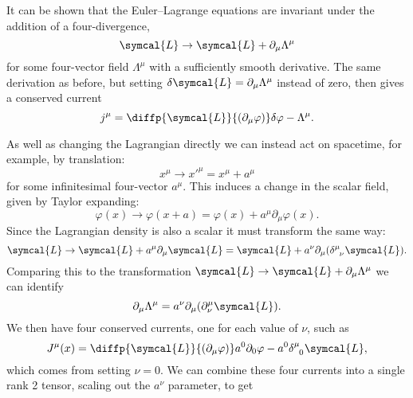 \documentclass[fleqn]{NotesClass}
\newcommand{\lagrangianDensity}{\symcal{L}}
\begin{document}
    It can be shown that the Euler--Lagrange equations are invariant under the addition of a four-divergence, 
    \begin{equation}
        \lagrangianDensity \to \lagrangianDensity + \partial_\mu \Lambda^\mu
    \end{equation}
    for some four-vector field \(\Lambda^\mu\) with a sufficiently smooth derivative.
    The same derivation as before, but setting \(\delta\lagrangianDensity = \partial_\mu \Lambda^\mu\) instead of zero, then gives a conserved current
    \begin{equation}
        j^\mu = \diffp{\lagrangianDensity}{(\partial_\mu\varphi)} \delta\varphi - \Lambda^\mu.
    \end{equation}
    
    As well as changing the Lagrangian directly we can instead act on spacetime, for example, by translation:
    \begin{equation}
        x^\mu \to x'^\mu = x^\mu + a^\mu
    \end{equation}
    for some infinitesimal four-vector \(a^\mu\).
    This induces a change in the scalar field, given by Taylor expanding:
    \begin{equation}
        \varphi(x) \to \varphi(x + a) = \varphi(x) + a^\mu \partial_\mu \varphi(x).
    \end{equation}
    Since the Lagrangian density is also a scalar it must transform the same way:
    \begin{equation}
        \lagrangianDensity \to \lagrangianDensity + a^\mu \partial_\mu \lagrangianDensity = \lagrangianDensity + a^\nu \partial_\mu (\tensor{\delta}{^\mu_\nu} \lagrangianDensity).
    \end{equation}
    Comparing this to the transformation \(\lagrangianDensity \to \lagrangianDensity + \partial_\mu \Lambda^\mu\) we can identify
    \begin{equation}
        \partial_\mu \Lambda^\mu = a^\nu \partial_\mu (\partial^\mu_\nu \lagrangianDensity).
    \end{equation}
    We then have four conserved currents, one for each value of \(\nu\), such as
    \begin{equation}
        J^\mu(x) = \diffp{\lagrangianDensity}{(\partial_\mu \varphi)}a^0\partial_0\varphi - a^0 \tensor{\delta}{^\mu_0}\lagrangianDensity,
    \end{equation}
    which comes from setting \(\nu = 0\).
    We can combine these four currents into a single rank 2 tensor, scaling out the \(a^\nu\) parameter, to get
\end{document}

